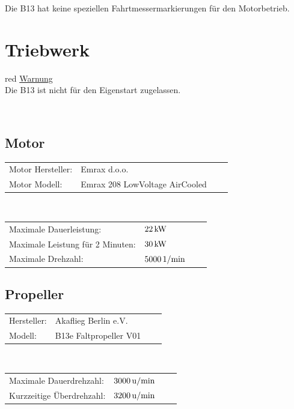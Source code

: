 \vspace{0.2cm}
Die B13 hat keine speziellen Fahrtmessermarkierungen für den Motorbetrieb.
\newpage
\section{Triebwerk}
\begin{color}{red}
\large{\underline{Warnung}}\\
Die B13 ist nicht für den Eigenstart zugelassen.
\end{color}\\

\subsection{Motor}
\begin{tabular}{p{}p{}ll}
Motor Hersteller: & Emrax d.o.o.\\
Motor Modell: & Emrax 208 LowVoltage AirCooled\\
\end{tabular}\\

\vspace{0.2cm}
\begin{tabular}{p{}p{}ll}
Maximale Dauerleistung: & $\unit[22]{kW}$\\
Maximale Leistung für 2 Minuten: & $\unit[30]{kW}$\\
Maximale Drehzahl: & $\unit[5000]{1/min}$
\end{tabular}

\subsection{Propeller}
\begin{tabular}{p{}p{}ll}
Hersteller: & Akaflieg Berlin e.V. \\
Modell: & B13e Faltpropeller V01 \\
\end{tabular}\\

\vspace{0.2cm}
\begin{tabular}{p{}p{}ll}
Maximale Dauerdrehzahl: & $\unit[3000]{u/min}$ \\
Kurzzeitige Überdrehzahl: & $\unit[3200]{u/min}$ \\
\end{tabular}

